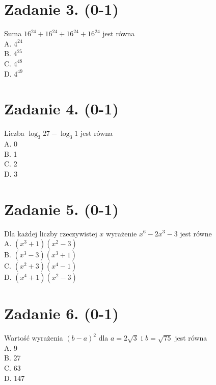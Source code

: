 \documentclass[10pt]{article}
\begin{document}
\section*{Zadanie 3. (0-1)}
Suma \(16^{24}+16^{24}+16^{24}+16^{24}\) jest równa\\
A. \(4^{24}\)\\
B. \(4^{25}\)\\
C. \(4^{48}\)\\
D. \(4^{49}\)

\section*{Zadanie 4. (0-1)}
Liczba \(\log _{3} 27-\log _{3} 1\) jest równa\\
A. 0\\
B. 1\\
C. 2\\
D. 3

\section*{Zadanie 5. (0-1)}
Dla każdej liczby rzeczywistej \(x\) wyrażenie \(x^{6}-2 x^{3}-3\) jest równe\\
A. \(\left(x^{3}+1\right)\left(x^{2}-3\right)\)\\
B. \(\left(x^{3}-3\right)\left(x^{3}+1\right)\)\\
C. \(\left(x^{2}+3\right)\left(x^{4}-1\right)\)\\
D. \(\left(x^{4}+1\right)\left(x^{2}-3\right)\)

\section*{Zadanie 6. (0-1)}
Wartość wyrażenia \((b-a)^{2}\) dla \(a=2 \sqrt{3}\) i \(b=\sqrt{75}\) jest równa\\
A. 9\\
B. 27\\
C. 63\\
D. 147
\end{document}
